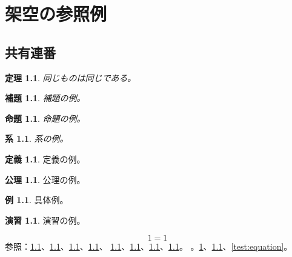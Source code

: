\documentclass[xelatex,ja=standard,11pt,a4paper,openany]{bxjsbook}
\newtheorem{theorem}{定理}[section]
\numberwithin{equation}{section}
\newtheorem{lemma}[lemma]{補題}
\newtheorem{proposition}[proposition]{命題}
\newtheorem{corollary}[corollary]{系}
\theoremstyle{definition}
\newtheorem{definition}[definition]{定義}
\newtheorem{axiom}[axiom]{公理}
\newtheorem{example}[example]{例}
\newtheorem{exercise}[exercise]{演習}
\begin{document}
\chapter{架空の参照例}\label{test:chapter}
\section{共有連番}\label{test:section}
\begin{theorem}\label{test:theorem}同じものは同じである。\end{theorem}
\begin{lemma}\label{test:lemma}補題の例。\end{lemma}
\begin{proposition}\label{test:proposition}命題の例。\end{proposition}
\begin{corollary}\label{test:corollary}系の例。\end{corollary}
\begin{definition}\label{test:definition}定義の例。\end{definition}
\begin{axiom}\label{test:axiom}公理の例。\end{axiom}
\begin{example}\label{test:example}具体例。\end{example}
\begin{exercise}\label{test:exercise}演習の例。\end{exercise}
\begin{equation}\label{test:equation}1=1\end{equation}
参照：\cref{test:theorem}、\cref{test:lemma}、\cref{test:proposition}、\cref{test:corollary}、
\cref{test:definition}、\cref{test:axiom}、\cref{test:example}、\cref{test:exercise}。
。\cref{test:chapter}、\cref{test:section}、\cref{test:equation}。
\end{document}
